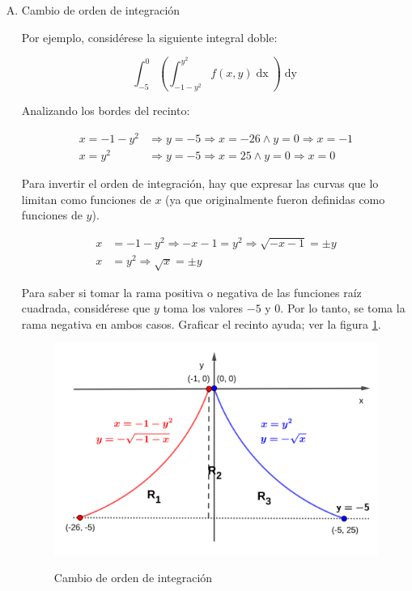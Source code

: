 \documentclass{article}
\begin{document}
\begin{enumerate}[(A)]
\item Cambio de orden de integración

Por ejemplo, considérese la siguiente integral doble:

\begin{equation}
\int_{-5}^0 \left( \int_{-1-y^2}^{y^2} f(x,y) \mathop{dx} \right) \mathop{dy}
\end{equation}

Analizando los bordes del recinto:

\begin{align}
x = -1-y^2 &\Rightarrow y = -5 \Rightarrow x = -26 \wedge y = 0 \Rightarrow x = -1 \\
x = y^2 &\Rightarrow y = -5 \Rightarrow x =25 \wedge y = 0 \Rightarrow x = 0
\end{align}

Para invertir el orden de integración, hay que expresar las curvas que lo limitan como funciones de $x$ (ya que originalmente fueron definidas como funciones de $y$).

\begin{align}
x &= -1-y^2 \Rightarrow -x - 1 = y^2 \Rightarrow \sqrt{-x-1} = \pm y \\
x &= y^2 \Rightarrow \sqrt{x} = \pm y
\end{align}

Para saber si tomar la rama positiva o negativa de las funciones raíz cuadrada, considérese que $y$ toma los valores $-5$ y $0$. Por lo tanto, se toma la rama negativa en ambos casos. Graficar el recinto ayuda; ver la figura \ref{fig:coi}.

\begin{figure}[ht]
\centering
\caption{Cambio de orden de integración}
\includegraphics[scale=0.75]{img/integrales/im_ej.png}
\label{fig:coi}
\end{figure}


\end{enumerate}
\end{document}
